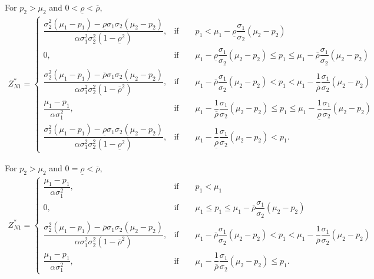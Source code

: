 \documentclass[10pt]{article}
\begin{document}
For $ p_2 > \mu_2 $ and $ 0 < \underline{\rho} < \overline{\rho} $,
{\footnotesize \begin{eqnarray}
Z_{N 1}^* = \left\{ \begin{matrix}
\dfrac{\sigma_2^2 (\mu_1 - p_1) - \underline{\rho} \sigma_1 \sigma_2 (\mu_2 - p_2)}{\alpha \sigma_1^2 \sigma_2^2 (1 - \underline{\rho}^2)}, & \text{if} \qquad p_1 < \mu_1 - \underline{\rho} \dfrac{\sigma_1}{\sigma_2} (\mu_2 - p_2) \\
0, & \text{if} \qquad \mu_1 - \underline{\rho} \dfrac{\sigma_1}{\sigma_2} (\mu_2 - p_2) \leqslant p_1 \leqslant \mu_1 - \overline{\rho} \dfrac{\sigma_1}{\sigma_2} (\mu_2 - p_2) \\
\dfrac{\sigma_2^2 (\mu_1 - p_1) - \overline{\rho} \sigma_1 \sigma_2 (\mu_2 - p_2)}{\alpha \sigma_1^2 \sigma_2^2 (1 - \overline{\rho}^2)}, & \text{if} \qquad \mu_1 - \overline{\rho} \dfrac{\sigma_1}{\sigma_2} (\mu_2 - p_2) < p_1 < \mu_1 - \dfrac1{\overline{\rho}} \dfrac{\sigma_1}{\sigma_2} (\mu_2 - p_2) \\
\dfrac{\mu_1 - p_1}{\alpha \sigma_1^2}, & \text{if} \qquad \mu_1 - \dfrac1{\overline{\rho}} \dfrac{\sigma_1}{\sigma_2} (\mu_2 - p_2) \leqslant p_1 \leqslant \mu_1 - \dfrac1{\underline{\rho}} \dfrac{\sigma_1}{\sigma_2} (\mu_2 - p_2) \\
\dfrac{\sigma_2^2 (\mu_1 - p_1) - \underline{\rho} \sigma_1 \sigma_2 (\mu_2 - p_2)}{\alpha \sigma_1^2 \sigma_2^2 (1 - \underline{\rho}^2)}, & \text{if} \qquad \mu_1 - \dfrac1{\underline{\rho}} \dfrac{\sigma_1}{\sigma_2} (\mu_2 - p_2) < p_1.
\end{matrix} \right.
\end{eqnarray}}

For $ p_2 > \mu_2 $ and $ 0 = \underline{\rho} < \overline{\rho} $,
{\footnotesize \begin{eqnarray}
Z_{N 1}^* = \left\{ \begin{matrix}
\dfrac{\mu_1 - p_1}{\alpha \sigma_1^2}, & \text{if} \qquad p_1 < \mu_1 \\
0, & \text{if} \qquad \mu_1 \leqslant p_1 \leqslant \mu_1 - \overline{\rho} \dfrac{\sigma_1}{\sigma_2} (\mu_2 - p_2) \\
\dfrac{\sigma_2^2 (\mu_1 - p_1) - \overline{\rho} \sigma_1 \sigma_2 (\mu_2 - p_2)}{\alpha \sigma_1^2 \sigma_2^2 (1 - \overline{\rho}^2)}, & \text{if} \qquad \mu_1 - \overline{\rho} \dfrac{\sigma_1}{\sigma_2} (\mu_2 - p_2) < p_1 < \mu_1 - \dfrac1{\overline{\rho}} \dfrac{\sigma_1}{\sigma_2} (\mu_2 - p_2) \\
\dfrac{\mu_1 - p_1}{\alpha \sigma_1^2}, & \text{if} \qquad \mu_1 - \dfrac1{\overline{\rho}} \dfrac{\sigma_1}{\sigma_2} (\mu_2 - p_2) \leqslant p_1.
\end{matrix} \right.
\end{eqnarray}}
\end{document}
